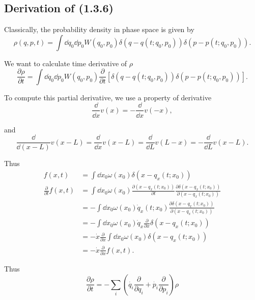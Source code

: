 \documentclass[10pt]{article}
\begin{document}
	\subsection{Derivation of (1.3.6)}

	Classically, the probability density in phase space is given by
	\begin{equation}
		\rho(q,p,t) = \int \dd q_0 \dd p_0 W(q_0, p_0) \delta(q - q(t;q_0,p_0)) \delta(p - p(t;q_0,p_0)).
	\end{equation}

	We want to calculate time derivative of $\rho$
	\begin{equation}
		\frac{\partial \rho}{\partial t} = \int \dd q_0 \dd p_0 W(q_0, p_0) \frac{\partial}{\partial t}[\delta(q - q(t;q_0,p_0)) \delta(p - p(t;q_0,p_0))].
	\end{equation}

	To compute this partial derivative, we use a property of derivative
	\begin{equation}
		\frac{\dd}{\dd x}v(x) = -\frac{\dd}{\dd x}v(-x),
	\end{equation}

	and
	\begin{equation}
		\frac{\dd}{\dd (x-L)}v(x-L) = \frac{\dd}{\dd x}v(x-L) = \frac{\dd}{\dd L}v(L-x) = - \frac{\dd}{\dd L}v(x-L).
	\end{equation}

	Thus
	\begin{align*}
		f(x,t) &= \int \dd x_0 \omega(x_0)\delta(x-q_x(t;x_0))\\
		\frac{\partial}{\partial t} f(x,t) &= \int \dd x_0 \omega(x_0) \frac{\partial (x-q_x(t;x_0))}{\partial t} \frac{\partial \delta(x-q_x(t;x_0))}{\partial (x-q_x(t;x_0))} \\
		&= - \int \dd x_0 \omega(x_0) \dot q_x(t;x_0) \frac{\partial \delta(x-q_x(t;x_0))}{\partial (x-q_x(t;x_0))}\\
		&= - \int \dd x_0 \omega(x_0) \dot q_x \frac{\partial}{\partial x}  \delta(x-q_x(t;x_0))\\
		&= - \dot x \frac{\partial}{\partial x} \int \dd x_0 \omega(x_0) \delta(x-q_x(t;x_0)) \\
		&= - \dot x \frac{\partial}{\partial x} f(x,t).
	\end{align*}

	Thus
	\begin{equation}
		\frac{\partial \rho}{\partial t} = -\sum_i\left(\dot{q_i} \frac{\partial}{\partial q_i} + \dot{p_i} \frac{\partial}{\partial p_i} \right) \rho
	\end{equation}
\end{document}
